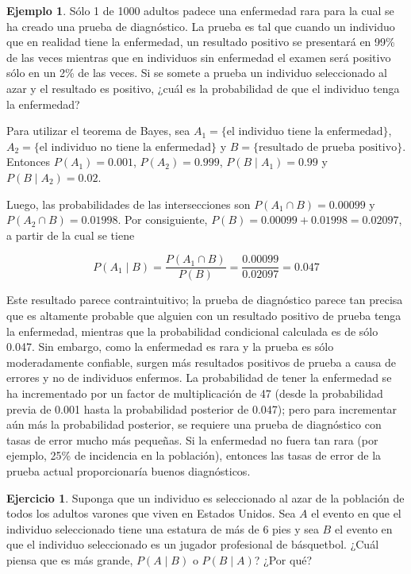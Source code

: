 \documentclass[
  11pt,
]{book}
\theoremstyle{definition}
\theoremstyle{definition}
\newtheorem{example}{Ejemplo}[chapter]
\theoremstyle{definition}
\newtheorem{exercise}{Ejercicio}[chapter]
\theoremstyle{definition}
\theoremstyle{remark}
\begin{document}
\begin{example}
Sólo 1 de 1000 adultos padece una enfermedad rara para la cual se ha creado una prueba de diagnóstico. La prueba es tal que cuando un individuo que en realidad tiene la enfermedad, un resultado positivo se presentará en 99\% de las veces mientras que en individuos sin enfermedad el examen será positivo sólo en un 2\% de las veces. Si se somete a prueba un individuo seleccionado al azar y el resultado es positivo, ¿cuál es la probabilidad de que el individuo tenga la enfermedad?

Para utilizar el teorema de Bayes, sea \(A_1 = \{\text{el individuo tiene la enfermedad}\}\), \(A_2 = \{\text{el individuo no tiene la enfermedad}\}\) y \(B = \{\text{resultado de prueba positivo}\}\). Entonces \(P(A_1) = 0.001\), \(P(A_2) = 0.999\), \(P(B \mid A_1) = 0.99\) y \(P(B \mid A_2) = 0.02\).

Luego, las probabilidades de las intersecciones son \(P(A_1 \cap B) = 0.00099\) y \(P(A_2 \cap B) = 0.01998\). Por consiguiente, \(P(B) = 0.00099 + 0.01998 = 0.02097\), a partir de la cual se tiene

\[
P(A_1 \mid B) = \frac{P(A_1 \cap B)}{P(B)} = \frac{0.00099}{0.02097} = 0.047
\]

Este resultado parece contraintuitivo; la prueba de diagnóstico parece tan precisa que es altamente probable que alguien con un resultado positivo de prueba tenga la enfermedad, mientras que la probabilidad condicional calculada es de sólo 0.047. Sin embargo, como la enfermedad es rara y la prueba es sólo moderadamente confiable, surgen más resultados positivos de prueba a causa de errores y no de individuos enfermos. La probabilidad de tener la enfermedad se ha incrementado por un factor de multiplicación de 47 (desde la probabilidad previa de 0.001 hasta la probabilidad posterior de 0.047); pero para incrementar aún más la probabilidad posterior, se requiere una prueba de diagnóstico con tasas de error mucho más pequeñas. Si la enfermedad no fuera tan rara (por ejemplo, 25\% de incidencia en la población), entonces las tasas de error de la prueba actual proporcionaría buenos diagnósticos.
\end{example}

\begin{exercise}
Suponga que un individuo es seleccionado al azar de la población de todos los adultos varones que viven en Estados Unidos. Sea \(A\) el evento en que el individuo seleccionado tiene una estatura de más de 6 pies y sea \(B\) el evento en que el individuo seleccionado es un jugador profesional de básquetbol. ¿Cuál piensa que es más grande, \(P(A\mid B)\) o \(P(B\mid A)\)? ¿Por qué?
\end{exercise}
\end{document}
